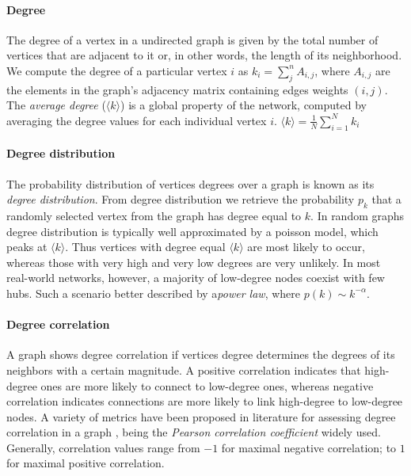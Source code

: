 \paragraph*{Degree}
The degree of a vertex in a undirected graph is given by the total number of vertices that are adjacent to it or, in other words, the length of its neighborhood.
We compute the degree of a particular vertex $i$ as 
$
k_i = \sum_j^{n} A_{i,j}
$,
where $A_{i,j}$ are the elements in the graph's adjacency matrix containing edges weights $(i,j)$.
The \textit{average degree} ($\langle k \rangle$) is a global property of the network, computed by averaging the degree values for each individual vertex $i$.
$
\langle k \rangle = \frac{1}{N} \sum_{i=1}^N k_i
$

\paragraph*{Degree distribution}
The probability distribution of vertices degrees over a graph is known as its \textit{degree distribution}.
From degree distribution we retrieve the probability $p_k$ that a randomly selected vertex from the graph has degree equal to $k$.
In random graphs degree distribution is typically well approximated by a poisson model, which peaks at $\langle k \rangle$.
Thus vertices with degree equal $\langle k \rangle$ are most likely to occur, whereas those with very high and very low degrees are very unlikely. 
In most real-world networks, however, a majority of low-degree nodes coexist with few hubs.
Such a scenario better described by a\textit{power law}, where $p(k) \sim k^{-\alpha}$.

\paragraph*{Degree correlation}
A graph shows degree correlation if vertices degree determines the degrees of its neighbors with a certain magnitude.
A positive correlation indicates that high-degree ones are more likely to connect to low-degree ones, whereas negative correlation indicates connections are more likely to link high-degree to low-degree nodes.
A variety of metrics have been proposed in literature for assessing degree correlation in a graph \cite{Newman2003b}, being the \textit{Pearson correlation coefficient} widely used.
Generally, correlation values range from $-1$ for maximal negative correlation; to $1$ for maximal positive correlation. 

